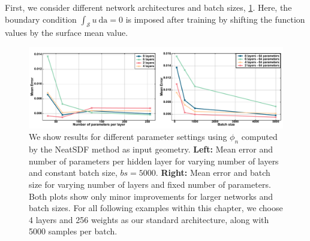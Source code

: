 \documentclass[draft,12pt,openany]{book}
\def\S{\mathcal{S}}
\theoremstyle{plainnormal}
\theoremstyle{remark}
\begin{document}
First, we consider different network architectures and batch sizes, \cref{poisson_diff_bs}. Here, the boundary condition $\int_\S u\ \mathrm{da} = 0$ is imposed after training by shifting the function values by the surface mean value. \par 
 \begin{figure}
    \centering
    \includegraphics[width=\textwidth]{Figures/pot_combined2.pdf}
    
    \caption{We show results for different parameter settings using $\phi_n$ computed by the NeatSDF method as input geometry. \textbf{Left:} Mean error and number of parameters per hidden layer for varying number of layers and constant batch size, $bs = 5000$. 
     \textbf{Right:} Mean error and batch size for varying number of layers and fixed number of parameters. Both plots show only minor improvements for larger networks and batch sizes. For all following examples within this chapter, we choose 4 layers and 256 weights as our standard architecture, along with 5000 samples per batch.}
    \label{poisson_diff_bs}
    \end{figure}
 
\end{document}

